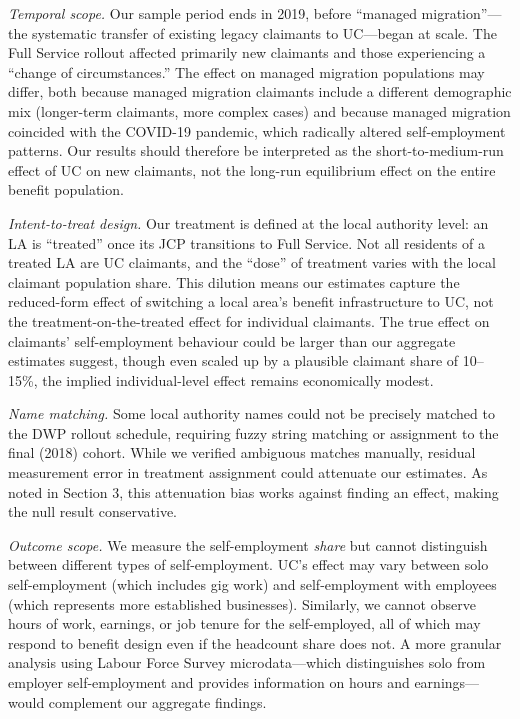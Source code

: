 \documentclass[12pt]{article}
\begin{document}
\textit{Temporal scope.} Our sample period ends in 2019, before ``managed migration''---the systematic transfer of existing legacy claimants to UC---began at scale. The Full Service rollout affected primarily new claimants and those experiencing a ``change of circumstances.'' The effect on managed migration populations may differ, both because managed migration claimants include a different demographic mix (longer-term claimants, more complex cases) and because managed migration coincided with the COVID-19 pandemic, which radically altered self-employment patterns. Our results should therefore be interpreted as the short-to-medium-run effect of UC on new claimants, not the long-run equilibrium effect on the entire benefit population.

\textit{Intent-to-treat design.} Our treatment is defined at the local authority level: an LA is ``treated'' once its JCP transitions to Full Service. Not all residents of a treated LA are UC claimants, and the ``dose'' of treatment varies with the local claimant population share. This dilution means our estimates capture the reduced-form effect of switching a local area's benefit infrastructure to UC, not the treatment-on-the-treated effect for individual claimants. The true effect on claimants' self-employment behaviour could be larger than our aggregate estimates suggest, though even scaled up by a plausible claimant share of 10--15\%, the implied individual-level effect remains economically modest.

\textit{Name matching.} Some local authority names could not be precisely matched to the DWP rollout schedule, requiring fuzzy string matching or assignment to the final (2018) cohort. While we verified ambiguous matches manually, residual measurement error in treatment assignment could attenuate our estimates. As noted in Section 3, this attenuation bias works against finding an effect, making the null result conservative.

\textit{Outcome scope.} We measure the self-employment \textit{share} but cannot distinguish between different types of self-employment. UC's effect may vary between solo self-employment (which includes gig work) and self-employment with employees (which represents more established businesses). Similarly, we cannot observe hours of work, earnings, or job tenure for the self-employed, all of which may respond to benefit design even if the headcount share does not. A more granular analysis using Labour Force Survey microdata---which distinguishes solo from employer self-employment and provides information on hours and earnings---would complement our aggregate findings.
\end{document}
